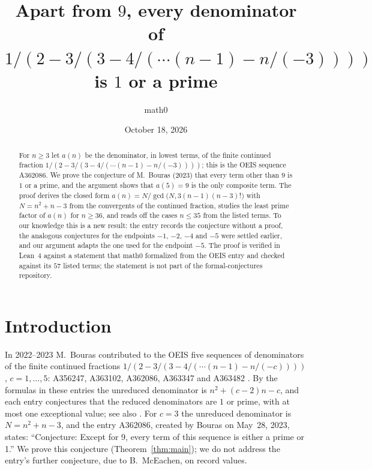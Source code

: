 \documentclass[11pt]{amsart}
\title[Denominators of a continued fraction (OEIS A362086)]{Apart from $9$, every denominator of $1/(2-3/(3-4/(\cdots(n-1)-n/(-3))))$ is $1$ or a prime}
\author{math0}
\date{October 18, 2026}
\theoremstyle{plain}
\theoremstyle{definition}
\begin{document}
\begin{abstract}
For $n\ge3$ let $a(n)$ be the denominator, in lowest terms, of the finite continued fraction $1/(2-3/(3-4/(\cdots(n-1)-n/(-3))))$; this is the OEIS sequence A362086.
We prove the conjecture of M.~Bouras (2023) that every term other than $9$ is $1$ or a prime, and the argument shows that $a(5)=9$ is the only composite term.
The proof derives the closed form $a(n)=N/\gcd\bigl(N,3(n-1)(n-3)!\bigr)$ with $N=n^2+n-3$ from the convergents of the continued fraction, studies the least prime factor of $a(n)$ for $n\ge36$, and reads off the cases $n\le35$ from the listed terms.
To our knowledge this is a new result: the entry records the conjecture without a proof, the analogous conjectures for the endpoints $-1$, $-2$, $-4$ and $-5$ were settled earlier, and our argument adapts the one used for the endpoint $-5$.
The proof is verified in Lean~4 against a statement that math0 formalized from the OEIS entry and checked against its $57$ listed terms; the statement is not part of the formal-conjectures repository.
\end{abstract}
\maketitle

\section{Introduction}

In 2022--2023 M.~Bouras contributed to the OEIS five sequences of denominators of the finite continued fractions $1/(2-3/(3-4/(\cdots(n-1)-n/(-c))))$, $c=1,\dots,5$: A356247, A363102, A362086, A363347 and A363482 \cite{A356247,A363102,A362086,A363347,A363482}. By the formulas in these entries the unreduced denominator is $n^2+(c-2)n-c$, and each entry conjectures that the reduced denominators are $1$ or prime, with at most one exceptional value; see also \cite{Bslides,Barxiv}.
For $c=3$ the unreduced denominator is $N=n^2+n-3$, and the entry A362086, created by Bouras on May~28, 2023, states: ``Conjecture: Except for 9, every term of this sequence is either a prime or 1.''
We prove this conjecture (Theorem~\ref{thm:main}); we do not address the entry's further conjecture, due to B.~McEachen, on record values.
\end{document}

